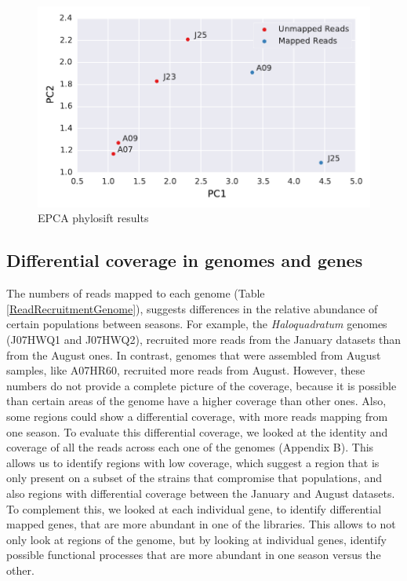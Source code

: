 \begin{figure}[hbt]
  \centering
  \includegraphics[width=\textwidth]{Chapter5/Figures/Unmapped_Mapped_EPCA.pdf}
  \caption{EPCA phylosift results}
  \label{EPCA_results}
\end{figure}


\clearpage
\subsection{Differential coverage in genomes and genes}

The numbers of reads mapped to each genome (Table \ref{ReadRecruitmentGenome}), suggests differences in the relative abundance of certain populations between seasons. For example, the \textit{Haloquadratum} genomes (J07HWQ1 and J07HWQ2), recruited more reads from the January datasets than from the August ones. In contrast, genomes that were assembled from August samples, like A07HR60, recruited more reads from August. However, these numbers do not provide a complete picture of the coverage, because it is possible than certain areas of the genome have a higher coverage than other ones. Also, some regions could show a differential coverage, with more reads mapping from one season. To evaluate this differential coverage, we looked at the identity and coverage of all the reads across each one of the genomes (Appendix B). This allows us to identify regions with low coverage, which suggest a region that is only present on a subset of the strains that compromise that populations, and also regions with differential coverage between the January and August datasets. To complement this, we looked at each individual gene, to identify differential mapped genes, that are more abundant in one of the libraries. This allows to not only look at regions of the genome, but by looking at individual genes, identify possible functional processes that are more abundant in one season versus the other.


